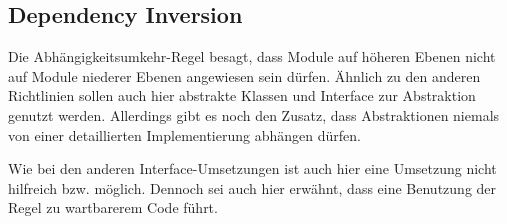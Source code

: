 {	\subsection{Dependency Inversion}
	Die Abhängigkeitsumkehr-Regel besagt, dass Module auf höheren Ebenen nicht auf Module niederer Ebenen angewiesen sein dürfen. Ähnlich zu den anderen Richtlinien sollen auch hier abstrakte Klassen und Interface zur Abstraktion genutzt werden.
	Allerdings gibt es noch den Zusatz, dass Abstraktionen niemals von einer detaillierten Implementierung abhängen dürfen.

	Wie bei den anderen Interface-Umsetzungen ist auch hier eine Umsetzung nicht hilfreich bzw. möglich. Dennoch sei auch hier erwähnt, dass eine Benutzung der Regel zu wartbarerem Code führt.
}